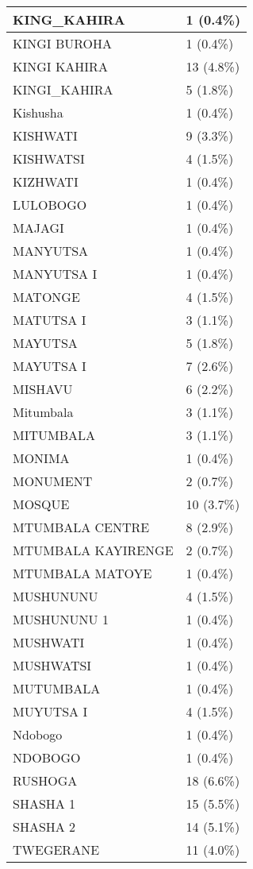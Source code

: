 \documentclass[
]{book}
\begin{document}
\begin{tabular}{l|l}
\hline
KING\_KAHIRA & 1 (0.4\%)\\
\hline
KINGI BUROHA & 1 (0.4\%)\\
\hline
KINGI KAHIRA & 13 (4.8\%)\\
\hline
KINGI\_KAHIRA & 5 (1.8\%)\\
\hline
Kishusha & 1 (0.4\%)\\
\hline
KISHWATI & 9 (3.3\%)\\
\hline
KISHWATSI & 4 (1.5\%)\\
\hline
KIZHWATI & 1 (0.4\%)\\
\hline
LULOBOGO & 1 (0.4\%)\\
\hline
MAJAGI & 1 (0.4\%)\\
\hline
MANYUTSA & 1 (0.4\%)\\
\hline
MANYUTSA I & 1 (0.4\%)\\
\hline
MATONGE & 4 (1.5\%)\\
\hline
MATUTSA I & 3 (1.1\%)\\
\hline
MAYUTSA & 5 (1.8\%)\\
\hline
MAYUTSA I & 7 (2.6\%)\\
\hline
MISHAVU & 6 (2.2\%)\\
\hline
Mitumbala & 3 (1.1\%)\\
\hline
MITUMBALA & 3 (1.1\%)\\
\hline
MONIMA & 1 (0.4\%)\\
\hline
MONUMENT & 2 (0.7\%)\\
\hline
MOSQUE & 10 (3.7\%)\\
\hline
MTUMBALA CENTRE & 8 (2.9\%)\\
\hline
MTUMBALA KAYIRENGE & 2 (0.7\%)\\
\hline
MTUMBALA MATOYE & 1 (0.4\%)\\
\hline
MUSHUNUNU & 4 (1.5\%)\\
\hline
MUSHUNUNU 1 & 1 (0.4\%)\\
\hline
MUSHWATI & 1 (0.4\%)\\
\hline
MUSHWATSI & 1 (0.4\%)\\
\hline
MUTUMBALA & 1 (0.4\%)\\
\hline
MUYUTSA I & 4 (1.5\%)\\
\hline
Ndobogo & 1 (0.4\%)\\
\hline
NDOBOGO & 1 (0.4\%)\\
\hline
RUSHOGA & 18 (6.6\%)\\
\hline
SHASHA 1 & 15 (5.5\%)\\
\hline
SHASHA 2 & 14 (5.1\%)\\
\hline
TWEGERANE & 11 (4.0\%)\\

\end{tabular}
\end{document}
